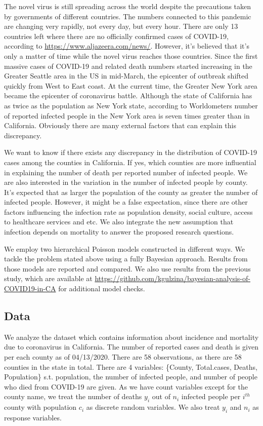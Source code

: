 \documentclass[11pt,twocolumn]{asaproc}
\begin{document}
 The novel virus is still spreading across the world despite the precautions taken by governments of different countries. The numbers connected to this pandemic are changing very rapidly, not every day, but every hour.  There are only 13 countries left where there are no officially confirmed cases of COVID-19, according to \url{https://www.aljazeera.com/news/}. However, it's believed that it's only a matter of time while the novel virus reaches those countries. Since the first massive cases of COVID-19 and related death numbers started increasing in the Greater Seattle area in the US in mid-March, the epicenter of outbreak shifted quickly from West to East coast. At the current time, the Greater New York area became the epicenter of coronavirus battle. Although the state of California has as twice as the population as New York state, according to Worldometers number of reported infected people in the New York area is seven times greater than in California. Obviously there are many external factors that can explain this discrepancy.
 
We want to know if there exists any discrepancy in the distribution of COVID-19 cases among the counties in California. If yes, which counties are more influential in explaining the number of death per reported number of infected people. We are also interested in the variation in the number of infected people by county. It's expected that as larger the population of the county as greater the number of infected people. However, it might be a false expectation, since there are other factors influencing the infection rate as population density, social culture, access to healthcare services and etc. We also integrate the new assumption that infection depends on mortality to answer the proposed research questions.

We employ two hierarchical Poisson models constructed in different ways. We tackle the problem stated above using a fully Bayesian approach. Results from those models are reported and compared. We also use results from the previous study, which are available at \url{https://github.com/kgulzina/bayesian-analysis-of-COVID19-in-CA} for additional model checks.




\subsection{Data}

We analyze the dataset which contains information about incidence and mortality due to coronavirus in California. The number of reported cases and death is given per each county as of 04/13/2020. There are 58 observations, as there are 58 counties in the state in total. There are 4 variables: \{County, Total.cases, Deaths, Population\} s.t. population, the number of infected people, and number of people who died from COVID-19 are given. As we have count variables except for the county name, we treat the number of deaths $y_i$  out of $n_i$ infected people per $i^{th}$ county with population $c_i$ as discrete random variables. We also treat $y_i$ and $n_i$ as response variables.
\end{document}
